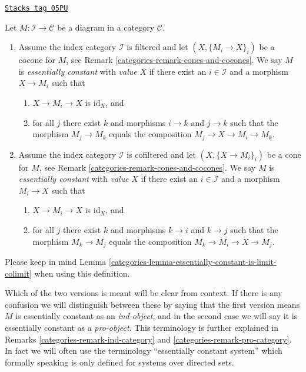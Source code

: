 \begin{definition}
\label{categories-definition-essentially-constant-diagram}
\href{https://stacks.math.columbia.edu/tag/05PU}{\texttt{Stacks tag 05PU}}

Let $M : \mathcal{I} \to \mathcal{C}$ be a diagram in a category
$\mathcal{C}$.
\begin{enumerate}
\item Assume the index category $\mathcal{I}$ is filtered and
let $(X, \{M_i \to X\}_i)$ be a cocone for $M$, see
Remark \ref{categories-remark-cones-and-cocones}. We say $M$ is
{\it essentially constant} with {\it value} $X$ if there exist an
$i \in \mathcal{I}$ and a morphism $X \to M_i$ such that
\begin{enumerate}
\item $X \to M_i \to X$ is $\text{id}_X$, and
\item for all $j$ there exist $k$ and morphisms $i \to k$ and $j \to k$
such that the morphism $M_j \to M_k$ equals the composition
$M_j \to X \to M_i \to M_k$.
\end{enumerate}
\item Assume the index category $\mathcal{I}$ is cofiltered and let
$(X, \{X \to M_i\}_i)$ be a cone for $M$, see
Remark \ref{categories-remark-cones-and-cocones}. We say
$M$ is {\it essentially constant} with {\it value} $X$ if
there exist an $i \in \mathcal{I}$
and a morphism $M_i \to X$ such that
\begin{enumerate}
\item $X \to M_i \to X$ is $\text{id}_X$, and
\item for all $j$ there exist $k$ and morphisms $k \to i$ and $k \to j$
such that the morphism $M_k \to M_j$ equals the composition
$M_k \to M_i \to X \to M_j$.
\end{enumerate}
\end{enumerate}
Please keep in mind Lemma \ref{categories-lemma-essentially-constant-is-limit-colimit}
when using this definition.
\end{definition}

Which of the two versions is meant will be clear from context. If there is
any confusion we will distinguish between these by saying that the first
version means $M$ is essentially constant as an {\it ind-object}, and in
the second case we will say it is essentially constant as a {\it pro-object}.
This terminology is further explained in
Remarks \ref{categories-remark-ind-category} and \ref{categories-remark-pro-category}.
In fact we will often use the terminology ``essentially constant system''
which formally speaking is only defined for systems over directed sets.

